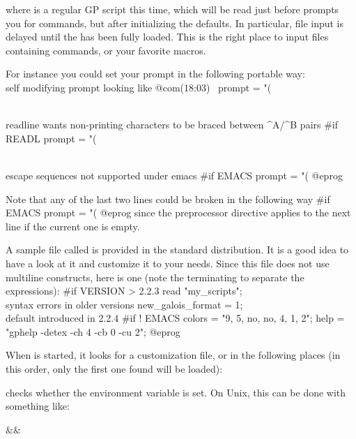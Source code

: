 \item {} where 
is a regular GP script this time, which will be read just before 
prompts you for commands, but after initializing the defaults. In particular,
file input is delayed until the  has been fully loaded. This is the
right place to input files containing  commands, or your favorite
macros.

\noindent For instance you could set your prompt in the following portable way:
\bprog
\\ self modifying prompt looking like @com\hbox{\rm(18:03) \kbd{ >}}
prompt   = "(%

\\ readline wants non-printing characters to be braced between ^A/^B pairs
#if READL prompt = "(%

\\ escape sequences not supported under emacs
#if EMACS prompt = "(%
@eprog

\noindent Note that any of the last two lines could be broken in the
following way
\bprog
#if EMACS
  prompt = "(%
@eprog
\noindent since the preprocessor directive applies to the next line if the
current one is empty.

A sample  file called  is provided in the
standard distribution. It is a good idea to have a look at it and customize
it to your needs. Since this file does not use multiline constructs, here is
one (note the terminating \kbd{;} to separate the expressions):
\bprog
#if VERSION > 2.2.3
{
  read "my_scripts";     \\ syntax errors in older versions
  new_galois_format = 1; \\ default introduced in 2.2.4
}
#if ! EMACS
{
  colors = "9, 5, no, no, 4, 1, 2";
  help   = "gphelp -detex -ch 4 -cb 0 -cu 2";
}
@eprog

When  is started, it looks for a customization file, or  in
the following places (in this order, only the first one found will be
loaded):

\noindent\item {} checks whether the environment variable
 is set. On Unix, this can be done with something like: \smallskip

\settabs\+\indent&\quad&\cr

